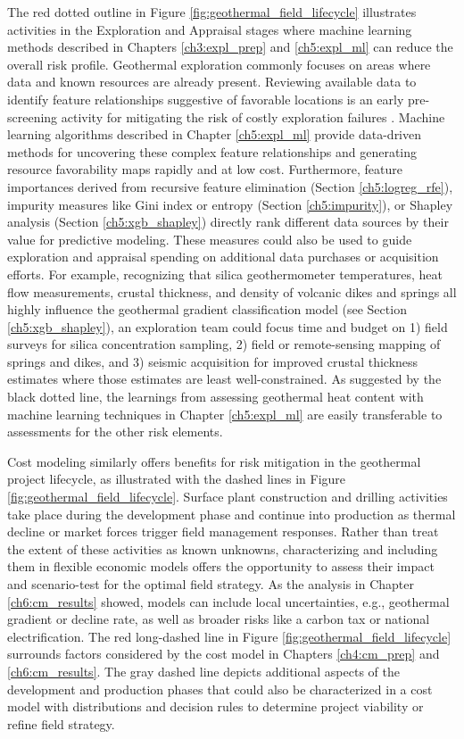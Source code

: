 The red dotted outline in Figure \ref{fig:geothermal_field_lifecycle} illustrates activities in the Exploration and Appraisal stages where machine learning methods described in Chapters \ref{ch3:expl_prep} and \ref{ch5:expl_ml} can reduce the overall risk profile. Geothermal exploration commonly focuses on areas where data and known resources are already present. Reviewing available data to identify feature relationships suggestive of favorable locations is an early pre-screening activity for mitigating the risk of costly exploration failures \citep{doughty_geovision_2018}. Machine learning algorithms described in Chapter \ref{ch5:expl_ml} provide data-driven methods for uncovering these complex feature relationships and generating resource favorability maps rapidly and at low cost. Furthermore, feature importances derived from recursive feature elimination (Section \ref{ch5:logreg_rfe}), impurity measures like Gini index or entropy (Section \ref{ch5:impurity}), or Shapley analysis (Section \ref{ch5:xgb_shapley}) directly rank different data sources by their value for predictive modeling. These measures could also be used to guide exploration and appraisal spending on additional data purchases or acquisition efforts. For example, recognizing that silica geothermometer temperatures, heat flow measurements, crustal thickness, and density of volcanic dikes and springs all highly influence the geothermal gradient classification model (see Section \ref{ch5:xgb_shapley}), an exploration team could focus time and budget on 1) field surveys for silica concentration sampling, 2) field or remote-sensing mapping of springs and dikes, and 3) seismic acquisition for improved crustal thickness estimates where those estimates are least well-constrained. As suggested by the black dotted line, the learnings from assessing geothermal heat content with machine learning techniques in Chapter \ref{ch5:expl_ml} are easily transferable to assessments for the other risk elements. 

Cost modeling similarly offers benefits for risk mitigation in the geothermal project lifecycle, as illustrated with the dashed lines in Figure \ref{fig:geothermal_field_lifecycle}. Surface plant construction and drilling activities take place during the development phase and continue into production as thermal decline or market forces trigger field management responses. Rather than treat the extent of these activities as known unknowns, characterizing and including them in flexible economic models offers the opportunity to assess their impact and scenario-test for the optimal field strategy. As the analysis in Chapter \ref{ch6:cm_results} showed, models can include local uncertainties, e.g., geothermal gradient or decline rate, as well as broader risks like a carbon tax or national electrification. The red long-dashed line in Figure \ref{fig:geothermal_field_lifecycle} surrounds factors considered by the cost model in Chapters \ref{ch4:cm_prep} and \ref{ch6:cm_results}. The gray dashed line depicts additional aspects of the development and production phases that could also be characterized in a cost model with distributions and decision rules to determine project viability or refine field strategy.

